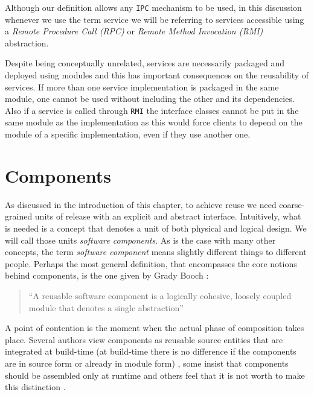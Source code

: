 Although our definition allows any \texttt{IPC} mechanism to be used, in this discussion whenever we use the term service we will be referring to
services accessible using a \emph{Remote Procedure Call (RPC)} or \emph{Remote Method Invocation (RMI)} abstraction.

Despite being conceptually unrelated, services are necessarily packaged and deployed using modules and this has important consequences on the
reusability of services. If more than one service implementation is packaged in the same module, one cannot be used without including the other
and its dependencies. Also if a service is called through \texttt{RMI} the interface classes cannot be put in the same module as the implementation
as this would force clients to depend on the module of a specific implementation, even if they use another one.


\section{Components}
\label{sec:components}

As discussed in the introduction of this chapter, to achieve reuse we need coarse-grained units of release with an
explicit and abstract interface. Intuitively, what is needed is a concept that denotes a unit of both physical and
logical design. We will call those units \emph{software components}. As is the case with many other concepts,
the term \emph{software component} means slightly different things to different people. Perhaps the most general
definition, that encompasses the core notions behind components, is the one given by Grady Booch \cite{Booch87}:

\begin{quotation}
``A reusable software component is a logically cohesive, loosely coupled module that denotes a single abstraction''
\end{quotation}

A point of contention is the moment when the actual phase of composition takes place. Several authors view components as reusable source entities that
are integrated at build-time (at build-time there is no difference if the components are in source form or already in module form) \cite{Lakos}, some
insist that components should be assembled only at runtime \cite{Szyperski} \cite{Heineman} and others feel that it is not worth to make this distinction
\cite{Czarnecki00} \cite{Sametinger}.

